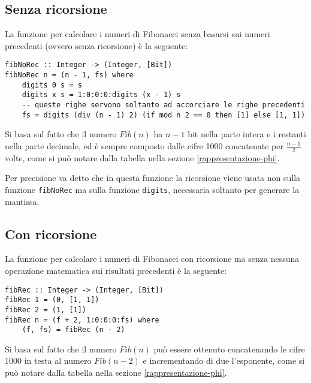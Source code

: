\documentclass[Lau,oneside]{sapthesis}
\newcommand{\code}[1]{\colorbox{light-gray}{\texttt{#1}}}
\begin{document}
\subsection{Senza ricorsione}
La funzione per calcolare i numeri di Fibonacci senza basarsi sui numeri precedenti (ovvero senza ricorsione) è la seguente:
\begin{verbatim}
fibNoRec :: Integer -> (Integer, [Bit])
fibNoRec n = (n - 1, fs) where
    digits 0 s = s
    digits x s = 1:0:0:0:digits (x - 1) s
    -- queste righe servono soltanto ad accorciare le righe precedenti
    fs = digits (div (n - 1) 2) (if mod n 2 == 0 then [1] else [1, 1])
\end{verbatim}
Si basa sul fatto che il numero $Fib(n)$ ha $n-1$ bit nella parte intera e i restanti nella parte decimale, ed è sempre composto dalle cifre 1000 concatenate per $\frac{n-1}{2}$ volte, come si può notare dalla tabella nella sezione \ref{rappresentazione-phi}.

Per precisione va detto che in questa funzione la ricorsione viene usata non sulla funzione \code{fibNoRec} ma sulla funzione \code{digits}, necessaria soltanto per generare la mantissa.


\subsection{Con ricorsione}
La funzione per calcolare i numeri di Fibonacci con ricorsione ma senza nessuna operazione matematica sui risultati precedenti è la seguente:
\begin{verbatim}
fibRec :: Integer -> (Integer, [Bit])
fibRec 1 = (0, [1, 1])
fibRec 2 = (1, [1])
fibRec n = (f + 2, 1:0:0:0:fs) where
    (f, fs) = fibRec (n - 2)
\end{verbatim}
Si basa sul fatto che il numero $Fib(n)$ può essere ottenuto concatenando le cifre 1000 in testa al numero $Fib(n-2)$ e incrementando di due l'esponente, come si può notare dalla tabella nella sezione \ref{rappresentazione-phi}.



\backmatter
\cleardoublepage
{}
{}


\end{document}
